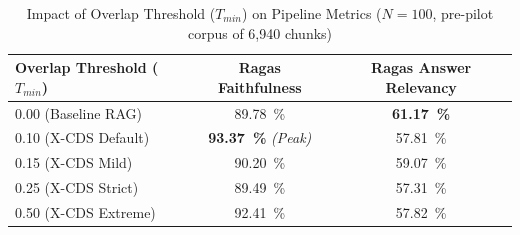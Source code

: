 \begin{table}[htbp]
\centering
\caption{Impact of Overlap Threshold ($T_{min}$) on Pipeline Metrics ($N=100$, pre-pilot corpus of 6,940 chunks)}
\label{tab:threshold_sweep}
\begin{tabular}{lcc}
\toprule
Overlap Threshold ($T_{min}$) & Ragas Faithfulness & Ragas Answer Relevancy \\
\midrule
0.00 (Baseline RAG) & \SI{89.78}{\percent} & \textbf{\SI{61.17}{\percent}} \\
0.10 (X-CDS Default) & \textbf{\SI{93.37}{\percent}} \textit{(Peak)} & \SI{57.81}{\percent} \\
0.15 (X-CDS Mild) & \SI{90.20}{\percent} & \SI{59.07}{\percent} \\
0.25 (X-CDS Strict) & \SI{89.49}{\percent} & \SI{57.31}{\percent} \\
0.50 (X-CDS Extreme) & \SI{92.41}{\percent} & \SI{57.82}{\percent} \\
\bottomrule
\end{tabular}
\end{table}
